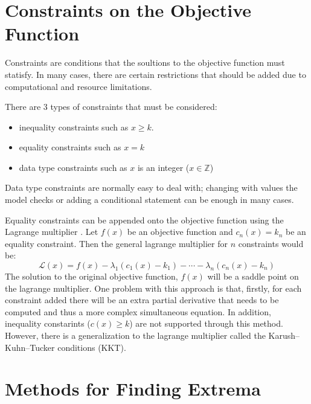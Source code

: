 \documentclass[10pt,a4paper]{report}
\begin{document}
		\section{Constraints on the Objective Function}
			Constraints are conditions that the soultions to the objective function must statisfy. In many cases, there are
			certain restrictions that should be added due to computational and resource limitations. \par
			There are 3 types of constraints that must be considered:
			\begin{itemize}
				\item inequality constraints such as $x \geq k$.
				\item equality constraints such as $x = k$
				\item data type constraints such as $x$ is an integer ($x \in \mathbb{Z}$)
			\end{itemize}
			Data type constraints are normally easy to deal with; changing with values the model checks or adding a conditional statement
			can be enough in many cases. \par
			Equality constraints can be appended onto the objective function using the Lagrange multiplier \autocite{LagrangeMultiplier}. Let
			$f(x)$ be an objective function and $c_{n}(x) = k_n$ be an equality constraint. Then the general lagrange multiplier for $n$ constraints would be:
			\begin{equation}
				\mathcal{L} (x) = f(x) - \lambda_1(c_{1}(x) - k_1) - \cdots - \lambda_n(c_{n}(x) - k_n)
			\end{equation}
			The solution to the original objective function, $f(x)$ will be a saddle point on the lagrange multiplier. One problem with this
			approach is that, firstly, for each constraint added there will be an extra partial derivative that needs to be computed and thus a more
			complex simultaneous equation. In addition, inequality constarints ($c(x) \geq k$) are not supported through this method. However, there
			is a generalization to the lagrange multiplier called the Karush–Kuhn–Tucker conditions (KKT).

		\section{Methods for Finding Extrema}
\end{document}
